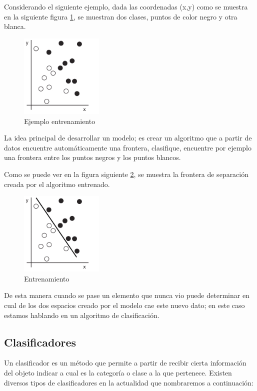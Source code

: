 Considerando el siguiente ejemplo, dada las coordenadas (x,y) como se muestra en la siguiente figura \ref{Fig:ejemplo-1}, se muestran dos clases, puntos de color negro y otra blanca.
\begin{figure}[H] \centering
  \includegraphics[height=4cm,keepaspectratio=true,clip=true]{imagenes/MarcoTeorico/sample.png}
  \caption{Ejemplo entrenamiento}\label{Fig:ejemplo-1}
\end{figure}

La idea principal de desarrollar un modelo; es crear un algoritmo que a partir de datos encuentre automáticamente una frontera, clasifique, encuentre por ejemplo una frontera entre los puntos negros y los puntos blancos.

Como se puede ver en la figura siguiente \ref{Fig:ejemplo-2}, se muestra la frontera de separación creada por el algoritmo entrenado.
\begin{figure}[H] \centering
  \includegraphics[height=4cm,keepaspectratio=true,clip=true]{imagenes/MarcoTeorico/sample-fit-1.png}
  \caption{Entrenamiento}\label{Fig:ejemplo-2}
\end{figure}

De esta manera cuando se pase un elemento que nunca vio puede determinar en cual de los dos espacios creado por el modelo cae este nuevo dato; en este caso estamos hablando en un algoritmo de clasificación.


\subsection{Clasificadores}\label{sub:clasificadores}

Un clasificador es un método que permite a partir de recibir cierta información del objeto indicar a cual es la categoría o clase a la que pertenece. Existen diversos tipos de clasificadores en la actualidad que nombraremos a continuación:

